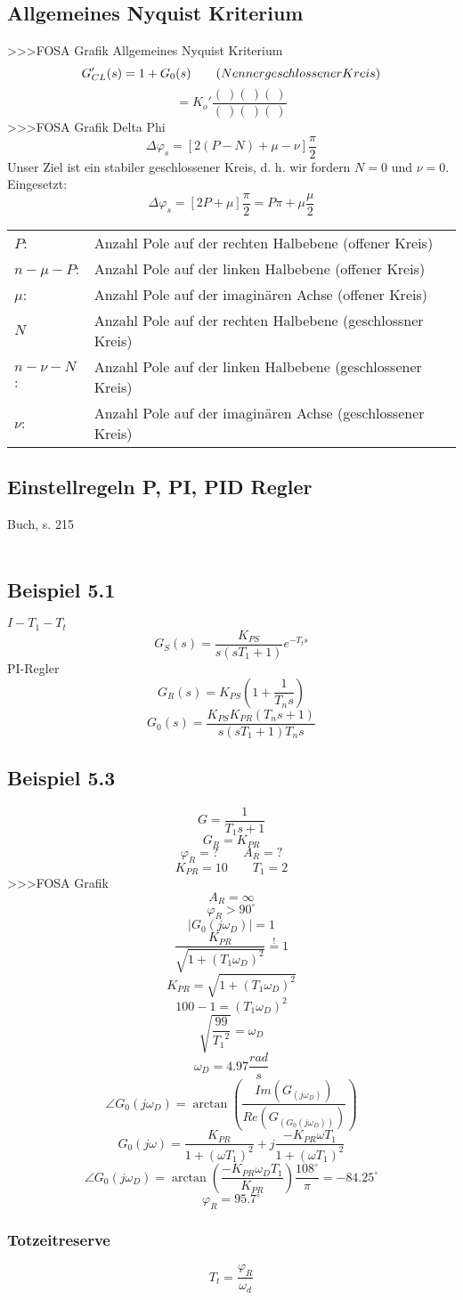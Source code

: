 \subsection{Allgemeines Nyquist Kriterium}
>>>FOSA Grafik Allgemeines Nyquist Kriterium
\[ G'_{CL}(s) = 1 + G_0(s) \qquad \text(Nenner geschlossener Kreis) \]
\[ = K_o' \frac{(~) (~) (~)}{(~) (~) (~)} \]
>>>FOSA Grafik Delta Phi
\[ \Delta\varphi_s = [2 (P - N) + \mu - \nu] \frac{\pi}{2} \]
Unser Ziel ist ein stabiler geschlossener Kreis, d. h. wir fordern $N = 0$ und $\nu = 0$. Eingesetzt: 
\[ \Delta\varphi_s = [2 P + \mu] \frac{\pi}{2} = P \pi + \mu \frac{\mu}{2} \]
\begin{tabular}{ll}
    $P$:            & Anzahl Pole auf der rechten Halbebene (offener Kreis) \\
    $n - \mu - P$:  & Anzahl Pole auf der linken Halbebene (offener Kreis) \\
    $\mu$:          & Anzahl Pole auf der imaginären Achse (offener Kreis) \\
    $N$             & Anzahl Pole auf der rechten Halbebene (geschlossner Kreis) \\
    $n - \nu - N$:  & Anzahl Pole auf der linken Halbebene (geschlossener Kreis) \\
    $\nu$:          & Anzahl Pole auf der imaginären Achse (geschlossener Kreis) \\
\end{tabular}

\subsection{Einstellregeln P, PI, PID Regler}
Buch, s. 215\\\\

\subsection*{Beispiel 5.1}
$I-T_1-T_t$
\[ G_S(s) = \frac{K_{PS}}{s (s T_1 + 1)} e^{-T_t s} \]
PI-Regler
\[ G_R(s) = K_{PS} \left(1 + \frac{1}{T_n s}\right) \]
\[ G_0(s) = \frac{K_{PS} K_{PR} (T_n s + 1)}{s (s T_1 + 1) T_n s} \]

\subsection*{Beispiel 5.3}
\[ G = \frac{1}{T_1 s + 1} \]
\[ G_R = K_{PR} \]
\[ \varphi_R = ? \qquad A_R = ? \]
\[ K_{PR} = 10 \qquad T_1 = 2 \]
>>>FOSA Grafik
\[ A_R = \infty \]
\[ \varphi_R > 90^\circ \]
\[ |G_0(j \omega_D)| = 1 \]
\[ \frac{K_{PR}}{\sqrt{1 + (T_1 \omega_D)^2}} \stackrel{!}{=} 1 \]
\[ K_{PR} = \sqrt{1 + (T_1 \omega_D)^2} \]
\[ 100 - 1 = (T_1 \omega_D)^2 \]
\[ \sqrt{\frac{99}{{T_1}^2}} = \omega_D \]
\[ \omega_D = 4.97 \frac{rad}{s} \]
\[ \angle G_0(j \omega_D) = \arctan\left(\frac{Im(G_(j\omega_D))}{Re(G_(G_0(j\omega_D)))}\right) \] 
\[ G_0(j\omega) = \frac{K_{PR}}{1 + (\omega T_1)^2} + j \frac{-K_{PR}\omega T_1}{1 + (\omega T_1)^2} \]
\[ \angle G_0(j\omega_D) = \arctan\left(\frac{-K_{PR} \omega_D T_1}{K_{PR}}\right) \frac{108^\circ}{\pi} = -84.25^\circ \]
\[ \varphi_R = 95.7^\circ \]

\subsubsection{Totzeitreserve}
\[ T_t = \frac{\varphi_R}{\omega_d} \]


